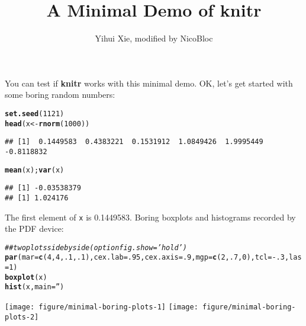 \documentclass{article}\usepackage[]{graphicx}\usepackage[]{color}
\makeatletter
\newcommand{\hlnum}[1]{\textcolor[rgb]{0.686,0.059,0.569}{#1}}%
\newcommand{\hlstr}[1]{\textcolor[rgb]{0.192,0.494,0.8}{#1}}%
\newcommand{\hlcom}[1]{\textcolor[rgb]{0.678,0.584,0.686}{\textit{#1}}}%
\newcommand{\hlopt}[1]{\textcolor[rgb]{0,0,0}{#1}}%
\newcommand{\hlstd}[1]{\textcolor[rgb]{0.345,0.345,0.345}{#1}}%
\newcommand{\hlkwb}[1]{\textcolor[rgb]{0.69,0.353,0.396}{#1}}%
\newcommand{\hlkwc}[1]{\textcolor[rgb]{0.333,0.667,0.333}{#1}}%
\newcommand{\hlkwd}[1]{\textcolor[rgb]{0.737,0.353,0.396}{\textbf{#1}}}%
\newenvironment{kframe}{%
 \def\at@end@of@kframe{}%
 \ifinner\ifhmode%
  \def\at@end@of@kframe{\end{minipage}}%
  \begin{minipage}{\columnwidth}%
 \fi\fi%
 \def\FrameCommand##1{\hskip\@totalleftmargin \hskip-\fboxsep
 \colorbox{shadecolor}{##1}\hskip-\fboxsep
     \hskip-\linewidth \hskip-\@totalleftmargin \hskip\columnwidth}%
 \MakeFramed {\advance\hsize-\width
   \@totalleftmargin\z@ \linewidth\hsize
   \@setminipage}}%
 {\par\unskip\endMakeFramed%
 \at@end@of@kframe}
\newenvironment{knitrout}{}{} %
\makeatother
\begin{document}
\title{A Minimal Demo of knitr}

\author{Yihui Xie, modified by NicoBloc}

\maketitle
You can test if \textbf{knitr} works with this minimal demo. OK, let's
get started with some boring random numbers:

\begin{knitrout}
\color{fgcolor}\begin{kframe}
\begin{alltt}
\hlkwd{set.seed}\hlstd{(}\hlnum{1121}\hlstd{)}
\hlkwd{head}\hlstd{(x} \hlkwb{<-} \hlkwd{rnorm}\hlstd{(}\hlnum{1000}\hlstd{))}
\end{alltt}
\begin{verbatim}
## [1]  0.1449583  0.4383221  0.1531912  1.0849426  1.9995449 -0.8118832
\end{verbatim}
\begin{alltt}
\hlkwd{mean}\hlstd{(x);} \hlkwd{var}\hlstd{(x)}
\end{alltt}
\begin{verbatim}
## [1] -0.03538379
## [1] 1.024176
\end{verbatim}
\end{kframe}
\end{knitrout}

The first element of \texttt{x} is 0.1449583. Boring boxplots
and histograms recorded by the PDF device:

\begin{knitrout}
\color{fgcolor}\begin{kframe}
\begin{alltt}
\hlcom{## two plots side by side (option fig.show='hold')}
\hlkwd{par}\hlstd{(}\hlkwc{mar}\hlstd{=}\hlkwd{c}\hlstd{(}\hlnum{4}\hlstd{,}\hlnum{4}\hlstd{,}\hlnum{.1}\hlstd{,}\hlnum{.1}\hlstd{),}\hlkwc{cex.lab}\hlstd{=}\hlnum{.95}\hlstd{,}\hlkwc{cex.axis}\hlstd{=}\hlnum{.9}\hlstd{,}\hlkwc{mgp}\hlstd{=}\hlkwd{c}\hlstd{(}\hlnum{2}\hlstd{,}\hlnum{.7}\hlstd{,}\hlnum{0}\hlstd{),}\hlkwc{tcl}\hlstd{=}\hlopt{-}\hlnum{.3}\hlstd{,}\hlkwc{las}\hlstd{=}\hlnum{1}\hlstd{)}
\hlkwd{boxplot}\hlstd{(x)}
\hlkwd{hist}\hlstd{(x,}\hlkwc{main}\hlstd{=}\hlstr{''}\hlstd{)}
\end{alltt}
\end{kframe}

{\centering \texttt{[image: figure/minimal-boring-plots-1]} 
\texttt{[image: figure/minimal-boring-plots-2]} 

}



\end{knitrout}
\end{document}

